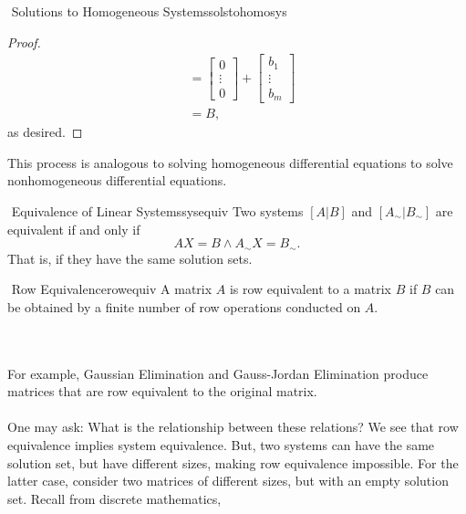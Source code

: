 \begin{theorem}{\Stop\,\,Solutions to Homogeneous Systems}{solstohomosys}
\begin{enumerate}
\begin{proof}
\begin{align*}
                    &=\begin{bmatrix} 0 \\ \vdots \\ 0 \end{bmatrix}+\begin{bmatrix} b_1 \\ \vdots \\ b_m \end{bmatrix} \\
                    &=B,
                \end{align*}
                as desired.
            \end{proof}
            This process is analogous to solving homogeneous differential equations to solve nonhomogeneous differential equations.
        \end{enumerate}
    
    \end{theorem}
    \begin{definition}{\Stop\,\,Equivalence of Linear Systems}{sysequiv}
        Two systems \([A|B]\) and \([A_\sim|B_\sim]\) are equivalent if and only if
        \begin{equation*}
            AX=B\wedge A_\sim X=B_\sim.
        \end{equation*}
        That is, if they have the same solution sets.
    \end{definition}
    \begin{definition}{\Stop\,\,Row Equivalence}{rowequiv}
        A matrix \(A\) is row equivalent to a matrix \(B\) if \(B\) can be obtained by a finite number of row operations conducted on \(A\).
    \end{definition}
    \vphantom
    \\
    \\
    For example, Gaussian Elimination and Gauss-Jordan Elimination produce matrices that are row equivalent to the original matrix.
    \\
    \\
    One may ask: What is the relationship between these relations? We see that row equivalence implies system equivalence. But, two systems can have the same solution set, but have different sizes, making row equivalence impossible. For the latter case, consider two matrices of different sizes, but with an empty solution set. Recall from discrete mathematics,
